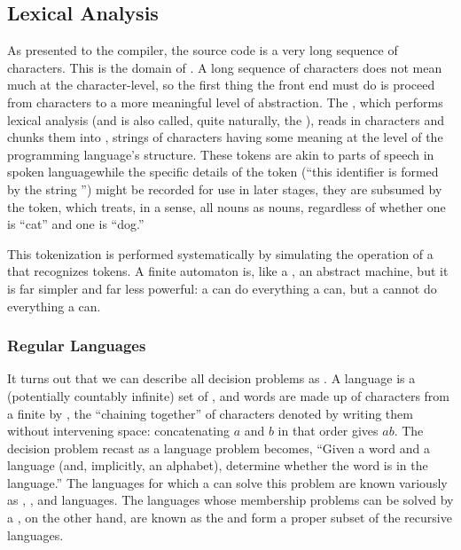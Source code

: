 \subsection{Lexical Analysis}
As presented to the compiler, the source code is a very long sequence of characters. This is the domain of . A long sequence of characters does not mean much at the character-level, so the first thing the front end must do is proceed from characters to a more meaningful level of abstraction. The , which performs lexical analysis (and is also called, quite naturally, the ), reads in characters and chunks them into , strings of characters having some meaning at the level of the programming language's structure. These tokens are akin to parts of speech in spoken language\empause while the specific details of the token (``this identifier is formed by the string '') might be recorded for use in later stages, they are subsumed by the token, which treats, in a sense, all nouns as nouns, regardless of whether one is ``cat'' and one is ``dog.''

This tokenization is performed systematically by simulating the operation of a  that recognizes tokens. A finite automaton is, like a \TM, an abstract machine, but it is far simpler and far less powerful: a \TM can do everything a \FA can, but a \FA cannot do everything a \TM can.

\subsubsection{Regular Languages}
It turns out that we can describe all decision problems as . A language is a (potentially countably infinite) set of , and words are made up of characters from a finite  by , the ``chaining together'' of characters denoted by writing them without intervening space: concatenating $a$ and $b$ in that order gives $ab$. The decision problem recast as a language problem becomes, ``Given a word and a language (and, implicitly, an alphabet), determine whether the word is in the language.'' The languages for which a \TM can solve this problem are known variously as , , and  languages. The languages whose membership problems can be solved by a \FA{}, on the other hand, are known as the  and form a proper subset of the recursive languages.

